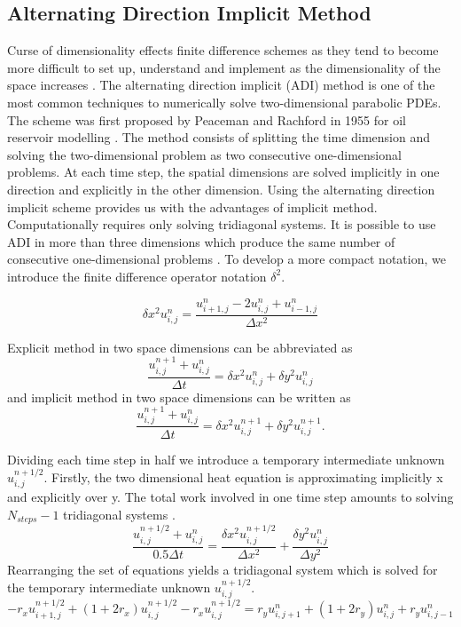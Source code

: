 \documentclass[12pt, oneside]{book}
\theoremstyle{plain}
\theoremstyle{definition}
\begin{document}
\subsection{Alternating Direction Implicit Method}
Curse of dimensionality effects finite difference schemes as they tend to become more difficult to set up, understand and implement as the dimensionality of the space increases \cite{duffyfinite}. The alternating direction implicit (ADI) method is one of the most common techniques to numerically solve two-dimensional parabolic PDEs. The scheme was first proposed by Peaceman and Rachford in 1955 for oil reservoir modelling \cite{peace}. The method consists of splitting the time dimension and solving the two-dimensional problem as two consecutive one-dimensional problems.  At each time step, the spatial dimensions are solved implicitly in one direction and explicitly in the other dimension. Using the alternating direction implicit scheme provides us with the advantages of implicit method. Computationally requires only solving tridiagonal systems. It is possible to use ADI in more than three dimensions which produce the same number of consecutive one-dimensional problems \cite{DougADI}. To develop a more compact notation, we introduce the finite difference operator notation $\delta^2$.

\begin{equation}
\delta x^2 u^{n}_{i,j}  = \frac{u^{n}_{i+1,j} - 2u^{n}_{i,j} + u^{n}_{i-1,j}}{\Delta x^2}
\end{equation}

Explicit method in two space dimensions can be abbreviated as
\begin{equation}
\frac{u^{n+1}_{i,j} + u^{n}_{i,j}}{\Delta t} = \delta x^2 u^{n}_{i,j} + \delta y^2 u^{n}_{i,j}
\end{equation}
and implicit method in two space dimensions can be written as
\begin{equation}
\frac{u^{n+1}_{i,j} + u^{n}_{i,j}}{\Delta t} = \delta x^2 u^{n+1}_{i,j} + \delta y^2 u^{n+1}_{i,j} .
\end{equation}

Dividing each time step in half we introduce a temporary intermediate unknown $u^{n+1/2}_{i,j}$. Firstly, the two dimensional heat equation is approximating implicitly x and explicitly over y. The total work involved in one time step amounts to solving $ N_{steps} - 1$ tridiagonal systems \cite{morton}. 
\begin{equation}
\frac{u^{n+1/2}_{i,j} + u^{n}_{i,j}}{0.5 \Delta t} = \frac{\delta x^2 u^{n+1/2}_{i,j} }{\Delta x^2} + \frac{\delta y^2 u^{n}_{i,j}}{\Delta y^2}
\end{equation}
Rearranging the set of equations yields a tridiagonal system which is solved for the temporary intermediate unknown $u^{n+1/2}_{i,j}$.
\begin{equation}
- r_x u^{n+1/2}_{i+1,j} + (1 + 2r_x) u^{n+1/2}_{i,j}  - r_x u^{n+1/2}_{i,j}  = r_y u^{n}_{i,j+1} + (1 + 2r_y) u^{n}_{i,j} + r_y u^{n}_{i,j-1}
\end{equation}
\end{document}
